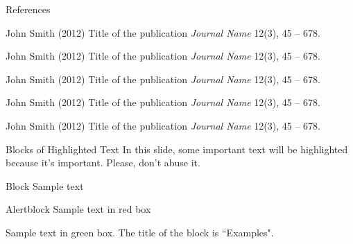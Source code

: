 \documentclass[aspectratio=169,xcolor=dvipsnames]{beamer}
\begin{document}
\begin{frame}{References}
    \footnotesize{
        \begin{thebibliography}{99}
             John Smith (2012)
            \newblock Title of the publication
            \newblock \emph{Journal Name} 12(3), 45 -- 678.
        \end{thebibliography}
        
        \begin{thebibliography}{99}
             John Smith (2012)
            \newblock Title of the publication
            \newblock \emph{Journal Name} 12(3), 45 -- 678.
        \end{thebibliography}
        
        \begin{thebibliography}{99}
             John Smith (2012)
            \newblock Title of the publication
            \newblock \emph{Journal Name} 12(3), 45 -- 678.
        \end{thebibliography}
        
        \begin{thebibliography}{99}
             John Smith (2012)
            \newblock Title of the publication
            \newblock \emph{Journal Name} 12(3), 45 -- 678.
        \end{thebibliography}
        
        \begin{thebibliography}{99}
             John Smith (2012)
            \newblock Title of the publication
            \newblock \emph{Journal Name} 12(3), 45 -- 678.
        \end{thebibliography}
    }
\end{frame}







\begin{frame}{Blocks of Highlighted Text}
    In this slide, some important text will be \alert{highlighted} because it's important. Please, don't abuse it.

    \begin{block}{Block}
        Sample text
    \end{block}

    \begin{alertblock}{Alertblock}
        Sample text in red box
    \end{alertblock}

    \begin{examples}
        Sample text in green box. The title of the block is ``Examples".
    \end{examples}
\end{frame}
\end{document}
